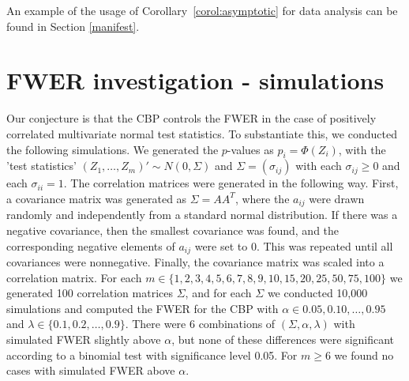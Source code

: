 \documentclass {imsart}
\begin{document}
An example of the usage of Corollary~\ref{corol:asymptotic} for data analysis can be found in Section \ref{manifest}.





\section{FWER investigation - simulations}


Our conjecture is that the CBP controls the FWER in the case of positively correlated multivariate normal test statistics. To substantiate this, we conducted the following simulations. We generated the $p$-values as $p_i = \Phi(Z_i)$, with the 'test statistics'   $(Z_1, \ldots, Z_m)'\sim{}N(0,\Sigma) $ and $\Sigma = (\sigma_{ij})$ with each $\sigma_{ij} \ge 0$ and each $\sigma_{ii} =1$. The correlation matrices were generated in the following way. First, a covariance matrix was generated as $\Sigma = AA^T$, where the $a_{ij}$ were drawn randomly and independently from a standard normal distribution. If there was a negative covariance, then the smallest covariance was found, and the corresponding negative elements of $a_{ij}$ were set to 0. This was repeated until all covariances were nonnegative. Finally, the covariance matrix was scaled into a correlation matrix. For each $m\in\{1,2,3,4,5,6,7,8,9,10,15,20,25,50,75, 100\}$ we generated 100 correlation matrices $\Sigma$, and for each $\Sigma$ we conducted 10,000 simulations and computed the FWER for the CBP with $\alpha \in {0.05,0.10,\ldots,0.95}$ and $\lambda\in\{0.1,0.2,\ldots,0.9\}$. There were 6 combinations of $(\Sigma,\alpha, \lambda)$ with simulated FWER slightly above $\alpha$, but none of these differences were significant according to a binomial test with significance level 0.05. For $m \ge 6$ we found no cases with simulated FWER above $\alpha$.



\end{document}
